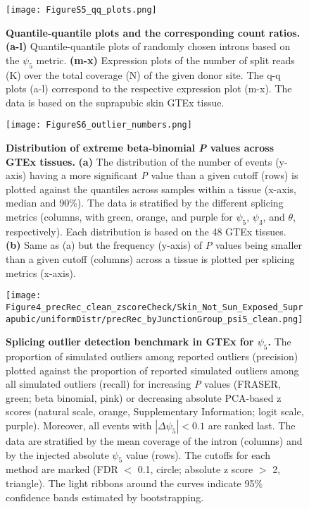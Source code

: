 \documentclass[a4paper,12pt]{article}
\begin{document}
\begin{figure}[h]
	\centering
	\texttt{[image: FigureS5\_qq\_plots.png]}
	\caption{
	    \textbf{Quantile-quantile plots and the corresponding count ratios.}
	    \textbf{(a-l)} Quantile-quantile plots of randomly chosen introns based
on the $\psi_5$ metric. \textbf{(m-x)} Expression plots of the number of split
reads (K) over the total coverage (N) of the given donor site. The q-q plots (a-l)
correspond to the respective expression plot (m-x). The data is based on the 
suprapubic skin GTEx tissue.
}
\end{figure}
\pagebreak

\begin{figure}[h]
	\centering
	\texttt{[image: FigureS6\_outlier\_numbers.png]}
	\caption{
	    \textbf{Distribution of extreme beta-binomial \textit{P} values across GTEx tissues.}
	    \textbf{(a)} The distribution of the number of events (y-axis) having a more 
	    significant \textit{P} value than a given cutoff (rows) is plotted
	    against the quantiles across samples within a tissue 
	    (x-axis, median and 90\%). The data is stratified by the different splicing 
	    metrics (columns, with green, orange, and purple for 
	    $\psi_5$, $\psi_3$, and $\theta$, respectively). 
	    Each distribution is based on the 48 GTEx tissues.
	    \textbf{(b)} Same as (a) but the frequency (y-axis) of \textit{P} values 
	    being smaller than a given cutoff (columns) across a tissue is plotted per 
	    splicing metrics (x-axis).
}
\end{figure}
\pagebreak


\begin{figure}[h]
\centering
	\texttt{[image: Figure4\_precRec\_clean\_zscoreCheck/Skin\_Not\_Sun\_Exposed\_Suprapubic/uniformDistr/precRec\_byJunctionGroup\_psi5\_clean.png]}
	\caption{
	    \textbf{Splicing outlier detection benchmark in GTEx for $\psi_5$.}
        The proportion of simulated outliers among reported outliers (precision)
plotted against the proportion of reported simulated outliers among all 
simulated outliers (recall) for increasing \textit{P} values (FRASER, green; 
beta binomial, pink) or decreasing absolute PCA-based z scores (natural scale, 
orange, Supplementary Information; logit scale, purple). Moreover, all events 
with $|\Delta\psi_5| < 0.1$ are ranked last. The data are stratified by the mean 
coverage of the intron (columns) and by the injected absolute $\psi_5$ value (rows).
The cutoffs for each method are marked (FDR $<$ 0.1, circle; absolute z score $>$ 2, triangle).
The light ribbons around the curves indicate 95\% confidence bands estimated 
by bootstrapping.
}
\end{figure}
\pagebreak
\end{document}
